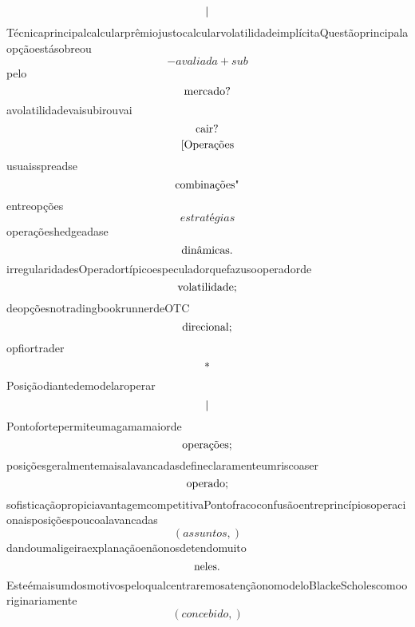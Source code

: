 \documentclass{article}
\begin{document}
\begin{equation}
$|$
\end{equation}TécnicaprincipalcalcularprêmiojustocalcularvolatilidadeimplícitaQuestãoprincipalaopçãoestásobreou\begin{equation}
- avaliada + sub
\end{equation}pelo\begin{equation}
$mercado?$
\end{equation}avolatilidadevaisubirouvai\begin{equation}
$cair?$
\end{equation}\begin{equation}
$[Operações$
\end{equation}usuaisspreadse\begin{equation}
$combinações"$
\end{equation}entreopções\begin{equation}
estratégias
\end{equation}operaçõeshedgeadase\begin{equation}
$dinâmicas.$
\end{equation}irregularidadesOperadortípicoespeculadorquefazusooperadorde\begin{equation}
$volatilidade;$
\end{equation}deopçõesnotradingbookrunnerdeOTC\begin{equation}
$direcional;$
\end{equation}opfiortrader\begin{equation}
$*$
\end{equation}Posiçãodiantedemodelaroperar\begin{equation}
$|$
\end{equation}Pontofortepermiteumagamamaiorde\begin{equation}
$operações;$
\end{equation}posiçõesgeralmentemaisalavancadasdefineclaramenteumriscoaser\begin{equation}
$operado;$
\end{equation}sofisticaçãopropiciavantagemcompetitivaPontofracoconfusãoentreprincípiosoperacionaisposiçõespoucoalavancadas\begin{equation}
\left( assuntos,\right)
\end{equation}dandoumaligeiraexplanaçãoenãonosdetendomuito\begin{equation}
$neles.$
\end{equation}EsteémaisumdosmotivospeloqualcentraremosatençãonomodeloBlackeScholescomooriginariamente\begin{equation}
\left( concebido,\right)

\end{equation}
\end{document}
